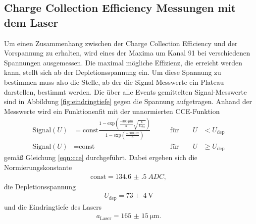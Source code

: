 \subsection{Charge Collection Efficiency Messungen mit dem Laser}

Um einen Zusammenhang zwischen der Charge Collection Efficiency und der Vorspannung zu erhalten,
wird eines der Maxima um Kanal 91 bei verschiedenen Spannungen ausgemessen. Die maximal mögliche Effizienz,
die erreicht werden kann, stellt sich ab der Depletionsspannung ein. Um diese Spannung zu bestimmen muss also
die Stelle, ab der die Signal-Messwerte ein Plateau darstellen, bestimmt werden. Die über alle Events gemittelten
Signal-Messwerte sind in Abbildung \ref{fig:eindringtiefe} gegen die Spannung aufgetragen. Anhand der Messwerte wird ein Funktionenfit mit der unnormierten CCE-Funktion
\begin{align}
  \text{Signal}(U) &= \text{const} \frac{1-\text{exp}\left(\frac{-\SI{300}{\micro\meter}}{a} \sqrt{\frac{U}{U_\text{dep}}}\right)}{1-\text{exp}\left(\frac{-\SI{300}{\micro\meter}}{a}\right)} &\qquad \text{für} \qquad U &< U_\text{dep}\\
  \text{Signal}(U) &= \text{const} &\qquad \text{für} \qquad U &\geq U_\text{dep}
\end{align}
gemäß Gleichung \eqref{eqn:cce} durchgeführt. Dabei ergeben sich die Normierungskonstante
\begin{align}
  \text{const} = \SI{134.6(5)}{ADC},
\end{align}
die Depletionsspannung
\begin{align}
  U_\text{dep} = \SI{73(4)}{\volt}
\end{align}
und die Eindringtiefe des Lasers
\begin{align}
  a_\text{Laser} = \SI{165(15)}{\micro\meter}.
\end{align}

